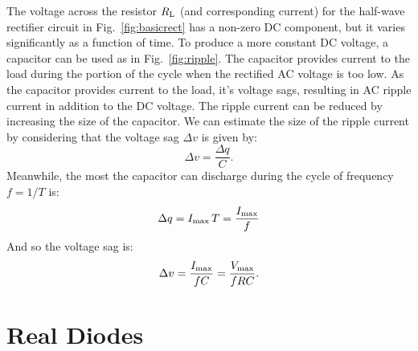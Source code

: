 The voltage across the resistor $R_{\rm L}$ (and corresponding current) for the half-wave rectifier circuit in Fig.~\ref{fig:basicrect} has a non-zero DC component, but it varies significantly as a function of time.  To produce a more constant DC voltage, a capacitor can be used as in Fig.~\ref{fig:ripple}.  The capacitor provides current to the load during the portion of the cycle when the rectified AC voltage is too low.
As the capacitor provides current to the load, it's voltage sags, resulting in AC ripple current in addition to the DC voltage.  The ripple current can be reduced by increasing the size of the capacitor.  We can estimate the size of the ripple current by considering that the voltage sag $\Delta v$ is given by:
\begin{displaymath}
\Delta v = \frac{\Delta q}{C}.
\end{displaymath}
Meanwhile, the most the capacitor can discharge during the cycle of frequency $f=1/T$ is:
\begin{displaymath}
\Delta q = I_{\rm max} \, T = \frac{I_{\rm max}}{f}  
\end{displaymath}
And so the voltage sag is:
\begin{displaymath}
\Delta v = \frac{I_{\rm max}}{fC} = \frac{V_{\rm max}}{fRC}.
\end{displaymath}

\section{Real Diodes}

